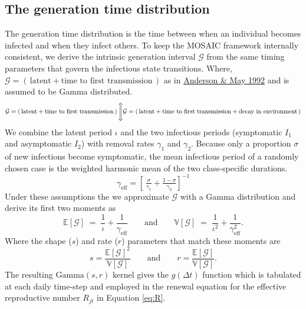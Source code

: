 \documentclass[
]{book}
\begin{document}
\subsection{The generation time distribution}\label{the-generation-time-distribution}

The generation time distribution is the time between when an individual becomes infected and when they infect others. To keep the MOSAIC framework internally consistent, we derive the intrinsic generation interval \(\mathcal{G}\) from the same timing parameters that govern the infectious state transitions. Where, \(\mathcal{G} = \left(\, \text{latent} + \text{time to first transmission}\, \right)\) as in \href{https://www.google.com/books/edition/Infectious_Diseases_of_Humans/HT0--xXBguQC?hl=en}{Anderson \& May 1992} and is assumed to be Gamma distributed.
\begin{equation}
\mathcal{G} = \left(\, \text{latent} + \text{time to first transmission}\, \right)\\
\Bigg\Updownarrow \\
\mathcal{G} = \left(\, \text{latent} + \text{time to first transmission} + \text{decay in environment}\, \right)
\label{eq:gen-time-range}
\end{equation}
We combine the latent period \(\iota\) and the two infectious periods (symptomatic \(I_1\) and asymptomatic \(I_2\)) with removal rates \(\gamma_1\) and \(\gamma_2\). Because only a proportion \(\sigma\) of new infections become symptomatic, the mean infectious period of a randomly chosen case is the weighted harmonic mean of the two class-specific durations.
\begin{equation}
\gamma_{\mathrm{eff}}
  = \left[\,\tfrac{\sigma}{\gamma_{1}} + \tfrac{1-\sigma}{\gamma_{2}}\right]^{-1}
\label{eq:gamma-eff}
\end{equation}
Under these assumptions the we approximate \(\mathcal{G}\) with a Gamma distribution and derive its first two moments as
\begin{equation}
\mathbb{E}[\mathcal{G}] \;=\; \frac{1}{\iota} + \frac{1}{\gamma_{\mathrm{eff}}}
\qquad \text{and} \qquad
\mathbb{V}[\mathcal{G}] \;=\; \frac{1}{\iota^{2}} + \frac{1}{\gamma_{\mathrm{eff}}^{2}}.
\label{eq:generation-time-moments}
\end{equation}
Where the shape (\(s\)) and rate (\(r\)) parameters that match these moments are
\begin{equation}
s = \frac{\mathbb{E}[\mathcal{G}]^{2}}{\mathbb{V}[\mathcal{G}]}
\qquad \text{and} \qquad
r = \frac{\mathbb{E}[\mathcal{G}]}{\mathbb{V}[\mathcal{G}]}.
\label{eq:gamma-shape-rate}
\end{equation}
The resulting \(\mathrm{Gamma}(s,r)\) kernel gives the \(g(\Delta t)\) function which is tabulated at each daily time-step and employed in the renewal equation for the effective reproductive number \(R_{jt}\) in Equation \eqref{eq:R}.
\end{document}
